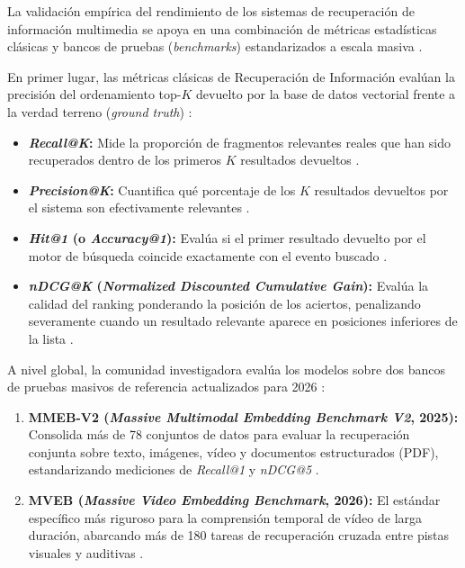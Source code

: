 La validación empírica del rendimiento de los sistemas de recuperación de información multimedia se apoya en una combinación de métricas estadísticas clásicas y bancos de pruebas (\textit{benchmarks}) estandarizados a escala masiva \cite{qwen3_vl_emb2026, eval_mrag2025}. %

En primer lugar, las métricas clásicas de Recuperación de Información evalúan la precisión del ordenamiento top-$K$ devuelto por la base de datos vectorial frente a la verdad terreno (\textit{ground truth}) \cite{qwen3_vl_emb2026}: %
\begin{itemize}
    \item \textbf{\textit{Recall@K}:} Mide la proporción de fragmentos relevantes reales que han sido recuperados dentro de los primeros $K$ resultados devueltos \cite{qwen3_vl_emb2026}. %
    \item \textbf{\textit{Precision@K}:} Cuantifica qué porcentaje de los $K$ resultados devueltos por el sistema son efectivamente relevantes \cite{qwen3_vl_emb2026}. %
    \item \textbf{\textit{Hit@1} (o \textit{Accuracy@1}):} Evalúa si el primer resultado devuelto por el motor de búsqueda coincide exactamente con el evento buscado \cite{qwen3_vl_emb2026}. %
    \item \textbf{\textit{nDCG@K} (\textit{Normalized Discounted Cumulative Gain}):} Evalúa la calidad del ranking ponderando la posición de los aciertos, penalizando severamente cuando un resultado relevante aparece en posiciones inferiores de la lista \cite{qwen3_vl_emb2026}. %
\end{itemize}

A nivel global, la comunidad investigadora evalúa los modelos sobre dos bancos de pruebas masivos de referencia actualizados para 2026 \cite{qwen3_vl_emb2026}: %
\begin{enumerate}
    \item \textbf{MMEB-V2 (\textit{Massive Multimodal Embedding Benchmark V2}, 2025):} Consolida más de 78 conjuntos de datos para evaluar la recuperación conjunta sobre texto, imágenes, vídeo y documentos estructurados (PDF), estandarizando mediciones de \textit{Recall@1} y \textit{nDCG@5} \cite{qwen3_vl_emb2026}. %
    \item \textbf{MVEB (\textit{Massive Video Embedding Benchmark}, 2026):} El estándar específico más riguroso para la comprensión temporal de vídeo de larga duración, abarcando más de 180 tareas de recuperación cruzada entre pistas visuales y auditivas \cite{qwen3_vl_emb2026}. %
\end{enumerate}

